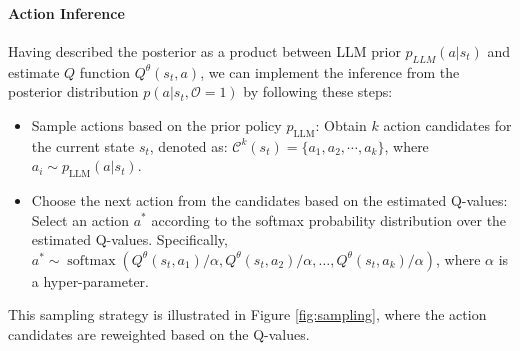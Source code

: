 \documentclass{article} %
\theoremstyle{plain}
\theoremstyle{definition}
\theoremstyle{remark}
\newcommand{\fig}{{Figure }}
\newcommand{\eq}{{Eq. }}
\newcommand{\yan}[1]{{ \color{blue}[yan: #1]}}
\begin{document}
{%
\paragraph{Action Inference} %
Having described the posterior as a product between LLM prior $p_{LLM}(a|s_t)$ and estimate $Q$ function $ Q^\theta(s_t, a) $, we can implement the inference from the posterior distribution $p(a|s_t,\mathcal{O}=1)$ by following these steps:
\begin{itemize}
    \item Sample actions based on the prior policy $p_\text{LLM}$: Obtain $k$ action candidates for the current state $s_t$, denoted as: $\mathcal{C}^k(s_t)=\{a_1,a_2,\cdots,a_k\}$, where $a_i \sim p_\text{LLM}(a|s_t)$.
    \item Choose the next action from the candidates based on the estimated Q-values: Select an action $a^*$ according to the softmax probability distribution over the estimated Q-values. Specifically, $a^* \sim \operatorname{softmax}( Q^\theta(s_t, a_1)/\alpha,  Q^\theta(s_t, a_2)/\alpha, \dots, Q^\theta(s_t, a_k)/\alpha)$, where $\alpha$ is a hyper-parameter.
\end{itemize}
This sampling strategy is illustrated in \fig \ref{fig:sampling}, where the action candidates are reweighted based on the Q-values. 
}
\end{document}
